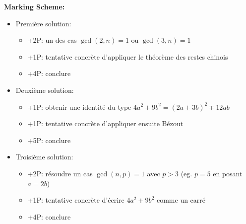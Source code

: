 \newpage
\textbf{Marking Scheme:}

\begin{itemize}
    \item Première solution:
    \begin{itemize}
    \item +2P: un des cas $\gcd(2,n)=1$ ou $\gcd(3,n)=1$
    \item +1P: tentative concrète d'appliquer le théorème des restes chinois
    \item +4P: conclure
    \end{itemize}
    
    \item Deuxième solution:
    \begin{itemize}
    \item +1P: obtenir une identité du type $4a^2+9b^2=(2a\pm 3b)^2\mp 12ab$
    \item +1P: tentative concrète d'appliquer ensuite Bézout
    \item +5P: conclure
    \end{itemize}
    
    \item Troisième solution:
    \begin{itemize}
    \item +2P: résoudre un cas $\gcd(n,p)=1$ avec $p>3$ (eg. $p=5$ en posant $a=2b$)
    \item +1P: tentative concrète d'écrire $4a^2+9b^2$ comme un carré
    \item +4P: conclure
    \end{itemize}
    

\end{itemize}
